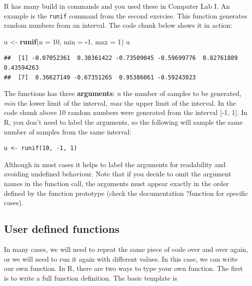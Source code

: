 \documentclass[
]{book}
\newenvironment{Shaded}{\begin{snugshade}}{\end{snugshade}}
\newcommand{\AttributeTok}[1]{\textcolor[rgb]{0.13,0.29,0.53}{#1}}
\newcommand{\DecValTok}[1]{\textcolor[rgb]{0.00,0.00,0.81}{#1}}
\newcommand{\FunctionTok}[1]{\textcolor[rgb]{0.13,0.29,0.53}{\textbf{#1}}}
\newcommand{\NormalTok}[1]{#1}
\newcommand{\OtherTok}[1]{\textcolor[rgb]{0.56,0.35,0.01}{#1}}
\newcommand{\SpecialCharTok}[1]{\textcolor[rgb]{0.81,0.36,0.00}{\textbf{#1}}}
\theoremstyle{definition}
\theoremstyle{definition}
\theoremstyle{definition}
\theoremstyle{definition}
\theoremstyle{remark}
\begin{document}
R has many build in commands and you used these in Computer Lab I. An example is the \texttt{runif} command from the second exercise. This function generates random numbers from an interval. The code chunk below shows it in action:

\begin{Shaded}
\begin{Highlighting}[]
\NormalTok{u }\OtherTok{\textless{}{-}} \FunctionTok{runif}\NormalTok{(}\AttributeTok{n =} \DecValTok{10}\NormalTok{, }\AttributeTok{min =} \SpecialCharTok{{-}}\DecValTok{1}\NormalTok{, }\AttributeTok{max =} \DecValTok{1}\NormalTok{)}
\NormalTok{u}
\end{Highlighting}
\end{Shaded}

\begin{verbatim}
##  [1] -0.07052361  0.30361422 -0.73509045 -0.59699776  0.82761889  0.43594263
##  [7]  0.36627149 -0.67351265  0.95386061 -0.59243023
\end{verbatim}

The functions has three \textbf{arguments}: \emph{n} the number of samples to be generated, \emph{min} the lower limit of the interval, \emph{max} the upper limit of the interval. In the code chunk above 10 random numbers were generated from the interval {[}-1, 1{]}. In R, you don't need to label the arguments, so the following will sample the same number of samples from the same interval:

\begin{verbatim}
u <- runif(10, -1, 1)
\end{verbatim}

Although in most cases it helps to label the arguments for readability and avoiding undefined behaviour. Note that if you decide to omit the argument names in the function call, the arguments must appear exactly in the order defined by the function prototype (check the documentation ?function for specific cases).

\hypertarget{user-defined-functions}{%
\subsection{User defined functions}\label{user-defined-functions}}

In many cases, we will need to repeat the same piece of code over and over again, or we will need to run it again with different values. In this case, we can write our own function. In R, there are two ways to type your own function. The first is to write a full function definition. The basic template is
\end{document}
